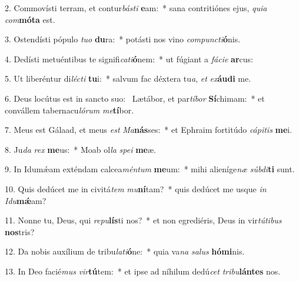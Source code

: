 2. Commovísti terram, et contur\textit{bás}\textit{ti} \textbf{e}am:~*  sana contritiónes ejus, \textit{qui}\textit{a} \textit{com}\textbf{mó}\textbf{ta} est.\

3. Ostendísti pópulo \textit{tu}\textit{o} \textbf{du}ra:~*  potásti nos vino \textit{com}\textit{punc}\textit{ti}\textbf{ó}nis.\

4. Dedísti metuéntibus te signifi\textit{ca}\textit{ti}\textbf{ó}nem:~*  ut fúgiant a \textit{fá}\textit{ci}\textit{e} \textbf{ar}cus:\

5. Ut liberéntur di\textit{léc}\textit{ti} \textbf{tu}i:~*  salvum fac déxtera tu\textit{a}, \textit{et} \textit{ex}\textbf{áu}\textbf{di} me.\

6. Deus locútus est in sancto suo: \dag\  Lætábor, et par\textit{tí}\textit{bor} \textbf{Sí}chimam:~*  et convállem tabernacu\textit{ló}\textit{rum} \textit{me}\textbf{tí}bor.\

7. Meus est Gálaad, et meus \textit{est} \textit{Ma}\textbf{nás}ses:~*  et Ephraim fortitúdo \textit{cá}\textit{pi}\textit{tis} \textbf{me}i.\

8. Ju\textit{da} \textit{rex} \textbf{me}us:~*  Moab ol\textit{la} \textit{spe}\textit{i} \textbf{me}æ.\

9. In Idumǽam exténdam calcea\textit{mén}\textit{tum} \textbf{me}um:~*  mihi alieníge\textit{næ} \textit{súb}\textit{di}\textbf{ti} sunt.\

10. Quis dedúcet me in civitá\textit{tem} \textit{mu}\textbf{ní}tam?~*  quis dedúcet me usque \textit{in} \textit{I}\textit{du}\textbf{mǽ}am?\

11. Nonne tu, Deus, qui \textit{re}\textit{pu}\textbf{lís}ti nos?~*  et non egrediéris, Deus in vir\textit{tú}\textit{ti}\textit{bus} \textbf{nos}tris?\

12. Da nobis auxílium de tribu\textit{la}\textit{ti}\textbf{ó}ne:~*  quia va\textit{na} \textit{sa}\textit{lus} \textbf{hó}\textbf{mi}nis.\

13. In Deo facié\textit{mus} \textit{vir}\textbf{tú}tem:~*  et ipse ad níhilum dedú\textit{cet} \textit{tri}\textit{bu}\textbf{lán}\textbf{tes} nos.\

